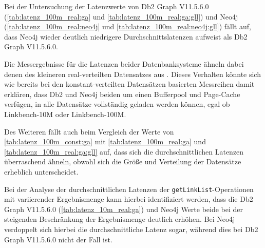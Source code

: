 Bei der Untersuchung der Latenzwerte von Db2 Graph V11.5.6.0 (\autoref{tab:latenz_100m_real:ga} und \autoref{tab:latenz_100m_real:ga:gll}) und Neo4j (\autoref{tab:latenz_100m_real:neo4j} und \autoref{tab:latenz_100m_real:neo4j:gll}) fällt auf, dass Neo4j wieder deutlich niedrigere Durchschnittslatenzen aufweist als Db2 Graph V11.5.6.0. 

Die Messergebnisse für die Latenzen beider Datenbanksysteme ähneln dabei denen des kleineren real-verteilten Datensatzes aus . Dieses Verhalten könnte sich wie bereits bei den konstant-verteilten Datensätzen basierten Messreihen damit erklären, dass Db2 und Neo4j beiden um einen Bufferpool und Page-Cache verfügen, in alle Datensätze vollständig geladen werden können, egal ob Linkbench-10M oder Linkbench-100M.

Des Weiteren fällt auch beim Vergleich der Werte von \autoref{tab:latenz_100m_const:ga} mit \autoref{tab:latenz_100m_real:ga} und \autoref{tab:latenz_100m_real:ga:gll} auf, dass sich die durchschnittlichen Latenzen überraschend ähneln, obwohl sich die Größe und Verteilung der Datensätze erheblich unterscheidet.

Bei der Analyse der durchschnittlichen Latenzen der \texttt{getLinkList}-Operationen mit variierender Ergebnismenge kann hierbei identifiziert werden, dass die Db2 Graph V11.5.6.0  (\autoref{tab:latenz_10m_real:ga}) und Neo4j Werte beide bei der steigenden Beschränkung der Ergebnismenge deutlich erhöhen. Bei Neo4j verdoppelt sich hierbei die durchschnittliche Latenz sogar, während dies bei Db2 Graph V11.5.6.0 nicht der Fall ist. 
\begin{table}[!h]
\centering
{}
\caption{Latenz Linkbench-100-Real Db2 Graph V11.5.6.0}
\label{tab:latenz_100m_real:ga}
\end{table}

